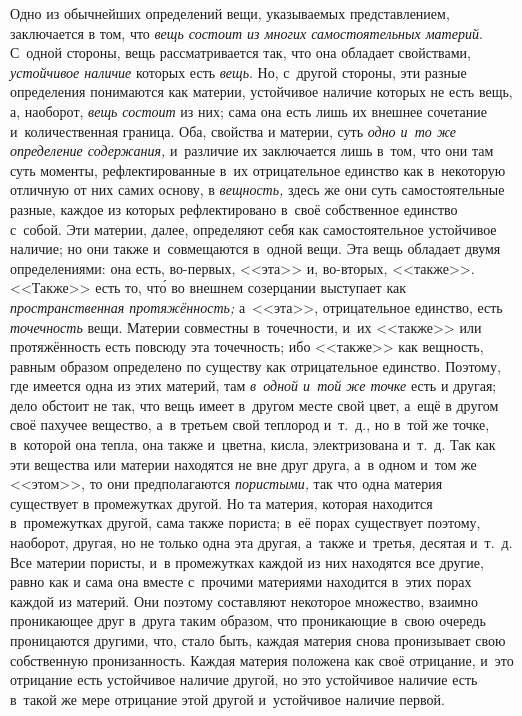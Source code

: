 Одно из обычнейших определений вещи, указываемых представлением, заключается
в том, что {\em вещь состоит из многих самостоятельных
материй}. С~одной стороны, вещь рассматривается так, что она обладает
свойствами, {\em устойчивое наличие} которых есть
{\em вещь}. Но, с~другой стороны, эти разные
определения понимаются как материи, устойчивое наличие которых не есть
вещь, а, наоборот, {\em вещь состоит} из них; сама она
есть лишь их внешнее сочетание и~количественная граница. Оба, свойства и
материи, суть {\em одно и~то же определение
содержания,} и~различие их заключается лишь в~том, что они там суть
моменты, рефлектированные в~их отрицательное единство как в~некоторую
отличную от них самих основу, в {\em вещность,} здесь
же они суть самостоятельные разные, каждое из которых рефлектировано в~своё
собственное единство с~собой. Эти материи, далее, определяют себя как
самостоятельное устойчивое наличие; но они также и~совмещаются в~одной
вещи. Эта вещь обладает двумя определениями: она есть, во-первых, <<эта>> и,
во-вторых, <<также>>. <<Также>> есть то, чт\'{о} во внешнем созерцании выступает
как {\em пространственная протяжённость;} а~<<эта>>,
отрицательное единство, есть {\em точечность} вещи.
Материи совместны в~точечности, и~их <<также>> или протяжённость есть повсюду
эта точечность; ибо <<также>> как вещность, равным образом определено по
существу как отрицательное единство. Поэтому, где имеется одна из этих
материй, там {\em в~одной и~той же точке} есть и
другая; дело обстоит не так, что вещь имеет в~другом месте свой цвет, а~ещё
в другом своё пахучее вещество, а~в третьем свой теплород и~т.~д., но в~той
же точке, в~которой она тепла, она также и~цветна, кисла, электризована
и~т.~д. Так как эти вещества или материи находятся не вне друг друга, а~в
одном и~том же <<этом>>, то они предполагаются
{\em пористыми,} так что одна материя существует в
промежутках другой. Но та материя, которая находится в~промежутках другой,
сама также пориста; в~её порах существует поэтому, наоборот, другая, но не
только одна эта другая, а~также и~третья, десятая и~т.~д. Все материи
пористы, и~в промежутках каждой из них находятся все другие, равно как и
сама она вместе с~прочими материями находится в~этих порах каждой из
материй. Они поэтому составляют некоторое множество, взаимно проникающее
друг в~друга таким образом, что проникающие в~свою очередь проницаются
другими, что, стало быть, каждая материя снова пронизывает свою собственную
пронизанность. Каждая материя положена как своё отрицание, и~это отрицание
есть устойчивое наличие другой, но это устойчивое наличие есть в~такой же
мере отрицание этой другой и~устойчивое наличие первой.

